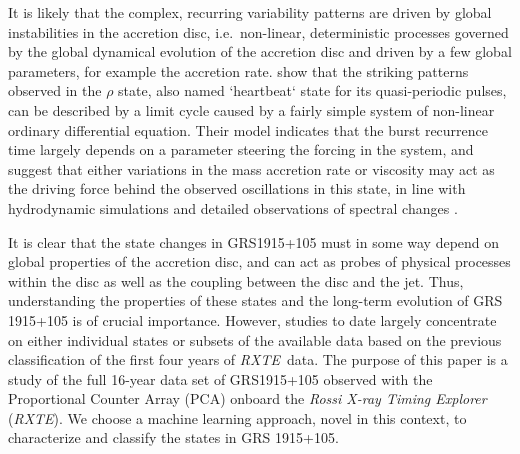 \documentclass[12pt]{emulateapj}
\newcommand{\project}[1]{\textsl{#1}}
\newcommand{\rxte}{\project{RXTE}}
\begin{document}
It is likely that the complex, recurring variability patterns are driven by global instabilities in the accretion disc, i.e.\ non-linear, deterministic processes governed by the global dynamical evolution of the accretion disc and driven by a few global parameters, for example the accretion rate. \citet{massaro2014} show that the striking patterns observed in the $\rho$ state, also named `heartbeat` state for its quasi-periodic pulses, can be described by a limit cycle caused by a fairly simple system of non-linear ordinary differential equation. Their model indicates that the burst recurrence time largely depends on a parameter steering the forcing in the system, and suggest that either variations in the mass accretion rate or viscosity may act as the driving force behind the observed oscillations in this state, in line with hydrodynamic simulations \citep{nayakshin2000, merloni2006} and detailed observations of spectral changes \citep{neilsen2011, neilsen2012}.

It is clear that the state changes in GRS1915+105 must in some way depend on global properties of the accretion disc, and can act as probes of physical processes within the disc as well as the coupling between the disc and the jet. Thus, understanding the properties of these states and the long-term evolution of GRS 1915+105 is of crucial importance. However, studies to date largely concentrate on either individual states or subsets of the available data based on the previous classification of the first four years of \rxte\ data. 
The purpose of this paper is a study of the full 16-year data set of GRS1915+105 observed with the Proportional Counter Array (PCA) onboard the \textit{Rossi X-ray Timing Explorer} (\rxte). We choose a machine learning approach, novel in this context, to characterize and classify the states in GRS 1915+105. 
\end{document}

